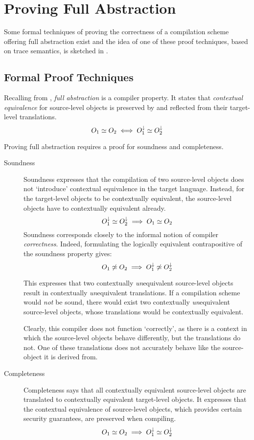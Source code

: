 \chapter{Proving Full Abstraction}
\label{chap:InformalProof}
Some formal techniques of proving the correctness of a compilation scheme offering full abstraction exist and the idea of one of these proof techniques, based on trace semantics, is sketched in .

\section{Formal Proof Techniques}
\label{sec:prooftechniques}
Recalling from , \emph{full abstraction} is a compiler property.
It states that \emph{contextual equivalence} for source-level objects is preserved by and reflected from their target-level translations.
\[
    O_{1} \simeq O_{2} \iff O_{1}^{\downarrow} \simeq O_{2}^{\downarrow}
\]

Proving full abstraction requires a proof for soundness  and completeness.
\begin{description}
\item[Soundness]
Soundness expresses that the compilation of two source-level objects does not `introduce' contextual equivalence in the target language.
Instead, for the target-level objects to be contextually equivalent, the source-level objects have to contextually equivalent already.
\[
    O_{1}^{\downarrow} \simeq O_{2}^{\downarrow} \implies O_{1} \simeq O_{2}
\]
Soundness corresponds closely to the informal notion of compiler \emph{correctness}.
Indeed, formulating the logically equivalent contrapositive of the soundness property gives:
\[
    O_{1} \not\simeq O_{2} \implies O_{1}^{\downarrow} \not\simeq O_{2}^{\downarrow}
\]

This expresses that two contextually \emph{un}equivalent source-level objects result in contextually \emph{un}equivalent translations.
If a compilation scheme would \emph{not} be sound, there would exist two contextually \emph{un}equivalent source-level objects, whose translations would be contextually equivalent.

Clearly, this compiler does not function `correctly', as there is a context in which the source-level objects behave differently, but the translations do not.
One of these translations does not accurately behave like the source-object it is derived from.
\item[Completeness]
Completeness says that all contextually equivalent source-level objects are translated to contextually equivalent target-level objects.
It expresses that the contextual equivalence of source-level objects, which provides certain security guarantees, are preserved when compiling.
\[
    O_{1} \simeq O_{2} \implies O_{1}^{\downarrow} \simeq O_{2}^{\downarrow}
\]
\end{description}

